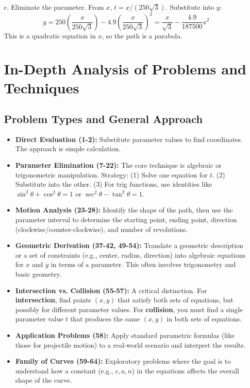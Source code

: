\documentclass{article}
\begin{document}
c. Eliminate the parameter. From \(x\), \(t = x/(250\sqrt{3})\). Substitute into \(y\):
\[y = 250\left(\frac{x}{250\sqrt{3}}\right) - 4.9\left(\frac{x}{250\sqrt{3}}\right)^2 = \frac{x}{\sqrt{3}} - \frac{4.9}{187500}x^2\]
This is a quadratic equation in \(x\), so the path is a parabola.

\section{In-Depth Analysis of Problems and Techniques}
\subsection{Problem Types and General Approach}
\begin{itemize}
    \item \textbf{Direct Evaluation (1-2):} Substitute parameter values to find coordinates. The approach is simple calculation.
    \item \textbf{Parameter Elimination (7-22):} The core technique is algebraic or trigonometric manipulation. Strategy: (1) Solve one equation for \(t\). (2) Substitute into the other. (3) For trig functions, use identities like \(\sin^2\theta+\cos^2\theta=1\) or \(\sec^2\theta-\tan^2\theta=1\).
    \item \textbf{Motion Analysis (23-28):} Identify the shape of the path, then use the parameter interval to determine the starting point, ending point, direction (clockwise/counter-clockwise), and number of revolutions.
    \item \textbf{Geometric Derivation (37-42, 49-54):} Translate a geometric description or a set of constraints (e.g., center, radius, direction) into algebraic equations for \(x\) and \(y\) in terms of a parameter. This often involves trigonometry and basic geometry.
    \item \textbf{Intersection vs. Collision (55-57):} A critical distinction. For \textbf{intersection}, find points \((x,y)\) that satisfy both sets of equations, but possibly for different parameter values. For \textbf{collision}, you must find a single parameter value \(t\) that produces the same \((x,y)\) in both sets of equations.
    \item \textbf{Application Problems (58):} Apply standard parametric formulas (like those for projectile motion) to a real-world scenario and interpret the results.
    \item \textbf{Family of Curves (59-64):} Exploratory problems where the goal is to understand how a constant (e.g., \(c, a, n\)) in the equations affects the overall shape of the curve.
\end{itemize}
\end{document}
